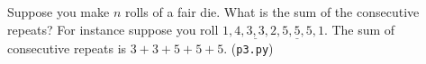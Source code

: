   Suppose you make $n$ rolls of a fair die.
  What is the sum of the consecutive repeats?
  For instance suppose you roll
  $1, 4, \underline{3, 3}, 2, \underline{5, 5, 5}, 1$.
  The sum of consecutive repeats is $3 + 3 + 5 + 5 + 5$.
  (\verb!p3.py!)
